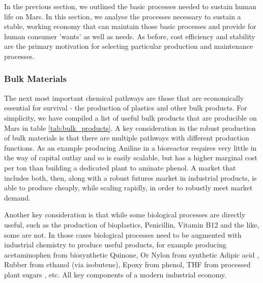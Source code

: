 \documentclass[fleqn,10pt]{Stylesheet} %
\begin{document}
In the previous section, we outlined the basic processes needed to sustain human life on Mars. In this section, we analyse the processes necessary to sustain a stable, working economy that can maintain those basic processes and provide for human consumer 'wants' as well as needs. As before, cost efficiency and stability are the primary motivation for selecting particular production and maintenance processes. 


\subsubsection{Bulk Materials}
\label{sec:necessities_bulk}

The next most important chemical pathways are those that are economically essential for survival - the production of plastics and other bulk products. For simplicity, we have compiled a list of useful bulk products that are producible on Mars in table \ref{tab:bulk_products}. A key consideration in the robust production of bulk materials is that there are multiple pathways with different production functions. As an example producing Aniline in a bioreactor requires very little in the way of capital outlay and so is easily scalable, but has a higher marginal cost per ton than building a dedicated plant to aminate phenol. A market that includes both, then, along with a robust futures market in industrial products, is able to produce cheaply, while scaling rapidly, in order to robustly meet market demand.

Another key consideration is that while some biological processes are directly useful, such as the production of bioplastics, Penicillin, Vitamin B12 and the like, some are not. In those cases biological processes need to be augmented with industrial chemistry to produce useful products, for example producing acetaminophen from biosynthetic Quinone, Or Nylon from synthetic Adipic acid \cite{WeiNiu2002}, Rubber from ethanol \cite{JunmingSun2011} (via isobutene), Epoxy from phenol, THF from processed plant sugars \cite{ShuoChen2018}, etc. All key components of a modern industrial economy.

\end{document}
